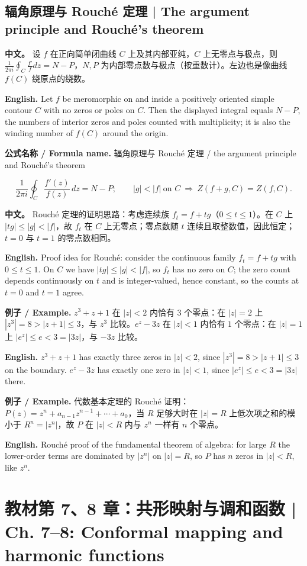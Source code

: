 \documentclass[UTF8,11pt,a4paper]{ctexart}
\newcommand{\EN}[1]{\par\noindent \textbf{English.} #1\par}
\newcommand{\FORMULA}[2]{\par\noindent\textbf{公式名称 / Formula name.} #1 / #2\par}
\newcommand{\EX}[2]{\par\noindent \textbf{例子 / Example.} #1\par\EN{#2}}
\newcommand{\APS}[2]{\par\noindent\textbf{中文。} #1\par\noindent\textbf{English.} #2\par\smallskip}
\begin{document}
\subsection{辐角原理与 Rouché 定理 | The argument principle and Rouché's theorem}
\APS{设 $f$ 在正向简单闭曲线 $C$ 上及其内部亚纯，$C$ 上无零点与极点，则 $\frac1{2\pi i}\oint_C\frac{f'}{f}dz=N-P$，$N,P$ 为内部零点数与极点（按重数计）。左边也是像曲线 $f(C)$ 绕原点的绕数。}{Let $f$ be meromorphic on and inside a positively oriented simple contour $C$ with no zeros or poles on $C$. Then the displayed integral equals $N-P$, the numbers of interior zeros and poles counted with multiplicity; it is also the winding number of $f(C)$ around the origin.}
\FORMULA{辐角原理与 Rouché 定理}{the argument principle and Rouché's theorem}
\[
\frac1{2\pi i}\oint_C\frac{f'(z)}{f(z)}\,dz=N-P;\qquad
|g|<|f|\ \text{on }C\ \Longrightarrow\ Z(f+g,C)=Z(f,C).
\]
\APS{Rouché 定理的证明思路：考虑连续族 $f_t=f+tg$（$0\le t\le1$）。在 $C$ 上 $|tg|\le|g|<|f|$，故 $f_t$ 在 $C$ 上无零点；零点数随 $t$ 连续且取整数值，因此恒定；$t=0$ 与 $t=1$ 的零点数相同。}{Proof idea for Rouché: consider the continuous family $f_t=f+tg$ with $0\le t\le1$. On $C$ we have $|tg|\le|g|<|f|$, so $f_t$ has no zero on $C$; the zero count depends continuously on $t$ and is integer-valued, hence constant, so the counts at $t=0$ and $t=1$ agree.}
\EX{$z^3+z+1$ 在 $|z|<2$ 内恰有 $3$ 个零点：在 $|z|=2$ 上 $|z^3|=8>|z+1|\le3$，与 $z^3$ 比较。$e^z-3z$ 在 $|z|<1$ 内恰有 $1$ 个零点：在 $|z|=1$ 上 $|e^z|\le e<3=|3z|$，与 $-3z$ 比较。}{$z^3+z+1$ has exactly three zeros in $|z|<2$, since $|z^3|=8>|z+1|\le3$ on the boundary. $e^z-3z$ has exactly one zero in $|z|<1$, since $|e^z|\le e<3=|3z|$ there.}
\EX{代数基本定理的 Rouché 证明：$P(z)=z^n+a_{n-1}z^{n-1}+\cdots+a_0$，当 $R$ 足够大时在 $|z|=R$ 上低次项之和的模小于 $R^n=|z^n|$，故 $P$ 在 $|z|<R$ 内与 $z^n$ 一样有 $n$ 个零点。}{Rouché proof of the fundamental theorem of algebra: for large $R$ the lower-order terms are dominated by $|z^n|$ on $|z|=R$, so $P$ has $n$ zeros in $|z|<R$, like $z^n$.}
\section[教材第 7、8 章 共形映射与调和函数]{教材第 7、8 章：共形映射与调和函数 | Ch. 7--8: Conformal mapping and harmonic functions}
\end{document}
